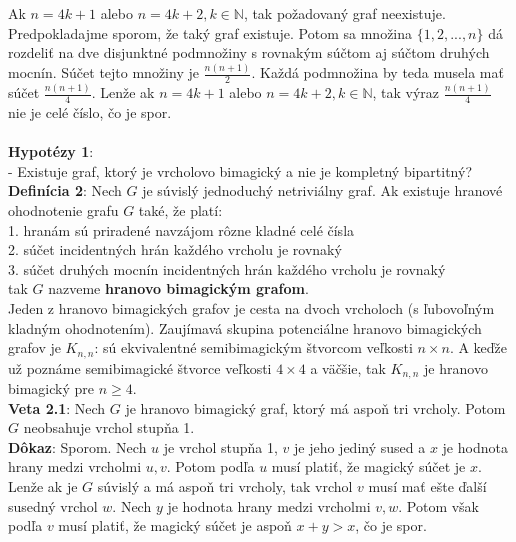 \documentclass[12pt]{article}
\begin{document}
Ak $n = 4k+1$ alebo $n = 4k+2, k \in \mathbb{N}$, tak požadovaný graf neexistuje. Predpokladajme sporom, že taký graf existuje. Potom sa množina $\{1, 2, ... , n\}$ dá rozdeliť na dve disjunktné podmnožiny s rovnakým súčtom aj súčtom druhých mocnín. Súčet tejto množiny je $\frac{n(n+1)}{2}$. Každá podmnožina by teda musela mať súčet $\frac{n(n+1)}{4}$. Lenže ak  $n = 4k+1$ alebo $n = 4k+2, k \in \mathbb{N}$, tak výraz $\frac{n(n+1)}{4}$ nie je celé číslo, čo je spor. \\\\

\textbf{Hypotézy 1}: \\
- Existuje graf, ktorý je vrcholovo bimagický a nie je kompletný bipartitný? \\

\textbf{Definícia 2}: Nech $G$ je súvislý jednoduchý netriviálny graf. Ak existuje hranové ohodnotenie grafu $G$ také, že platí: \\
1. hranám sú priradené navzájom rôzne kladné celé čísla \\
2. súčet incidentných hrán každého vrcholu je rovnaký \\
3. súčet druhých mocnín incidentných hrán každého vrcholu je rovnaký \\
tak $G$ nazveme \textbf{hranovo bimagickým grafom}. \\

Jeden z hranovo bimagických grafov je cesta na dvoch vrcholoch (s ľubovoľným kladným ohodnotením). Zaujímavá skupina potenciálne hranovo bimagických grafov je $K _{n,n}$: sú ekvivalentné semibimagickým štvorcom veľkosti $n \times n$. A keďže už poznáme semibimagické štvorce veľkosti $4 \times 4$ a väčšie, tak $K _{n,n}$ je hranovo bimagický pre $n \geq 4$.  \\

\textbf{Veta 2.1}: Nech $G$ je hranovo bimagický graf, ktorý má aspoň tri vrcholy. Potom $G$ neobsahuje vrchol stupňa 1. \\

\textbf{Dôkaz}: Sporom. Nech $u$ je vrchol stupňa 1, $v$ je jeho jediný sused a $x$ je hodnota hrany medzi vrcholmi $u,v$. Potom podľa $u$ musí platiť, že magický súčet je $x$. Lenže ak je $G$ súvislý a má aspoň tri vrcholy, tak vrchol $v$ musí mať ešte ďalší susedný vrchol $w$. Nech $y$ je hodnota hrany medzi vrcholmi $v,w$. Potom však podľa $v$ musí platiť, že magický súčet je aspoň $x + y > x$, čo je spor. \\\\ 
\end{document}
